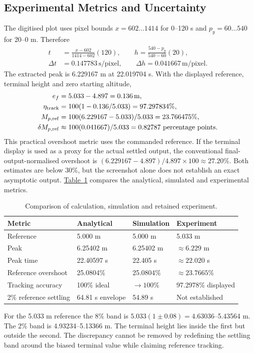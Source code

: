 \documentclass[12pt,a4paper]{article}
\numberwithin{equation}{section}
\newcommand{\unit}[1]{\,\mathrm{#1}}
\newcommand{\Tref}[1]{\hyperref[#1]{Table~\ref*{#1}}}
\newcommand{\thead}{\rowcolor{AngelBlue!28}}
\begin{document}
\subsection{Experimental Metrics and Uncertainty}
The digitised plot uses pixel bounds $x=602\ldots1414$ for 0--120 s and $p_y=60\ldots540$ for 20--0 m. Therefore
\begin{align}
t&=\frac{x-602}{1414-602}(120),\qquad h=\frac{540-p_y}{540-60}(20),\\
\Delta t&=0.147783\unit{s/pixel},\qquad\Delta h=0.041667\unit{m/pixel}.
\end{align}
The extracted peak is 6.229167 m at 22.019704 s. With the displayed reference, terminal height and zero starting altitude,
\begin{align}
e_f&=5.033-4.897=0.136\unit{m},\\
\eta_{\rm track}&=100(1-0.136/5.033)=97.297834\%,\\
M_{p,\rm ref}&=100(6.229167-5.033)/5.033=23.766475\%,\\
\delta M_{p,\rm ref}&\approx100(0.041667)/5.033=0.82787\text{ percentage points}.
\end{align}
This practical overshoot metric uses the commanded reference. If the terminal display is used as a proxy for the actual settled output, the conventional final-output-normalised overshoot is $(6.229167-4.897)/4.897\times100\approx27.20\%$. Both estimates are below 30\%, but the screenshot alone does not establish an exact asymptotic output.
\Tref{tab:comparison} compares the analytical, simulated and experimental metrics.
\begin{table}[H]\centering\small
\caption{Comparison of calculation, simulation and retained experiment.}\label{tab:comparison}
\begin{tabularx}{\linewidth}{lXXX}\toprule\thead
Metric & Analytical & Simulation & Experiment\\\midrule
Reference & 5.000 m & 5.000 m & 5.033 m\\
Peak & 6.25402 m & 6.25402 m & $\approx6.229$ m\\
Peak time & 22.40597 s & 22.405 s & $\approx22.020$ s\\
Reference overshoot & 25.0804\% & 25.0804\% & $\approx23.7665\%$\\
Tracking accuracy & 100\% ideal & $\to100\%$ & 97.2978\% displayed\\
2\% reference settling & 64.81 s envelope & 54.89 s & Not established\\\bottomrule
\end{tabularx}\end{table}
For the 5.033 m reference the 8\% band is $5.033(1\pm0.08)=4.63036$--5.43564 m. The 2\% band is 4.93234--5.13366 m. The terminal height lies inside the first but outside the second. The discrepancy cannot be removed by redefining the settling band around the biased terminal value while claiming reference tracking.
\end{document}

